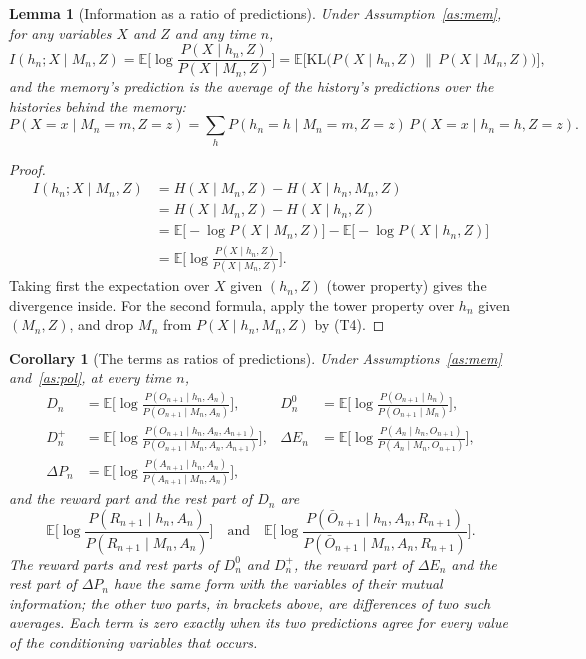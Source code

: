 \documentclass{article}
\newtheorem{lemma}[proposition]{Lemma}
\newtheorem{corollary}[proposition]{Corollary}
\theoremstyle{definition}
\theoremstyle{remark}
\newcommand{\E}{\mathbb{E}}
\newcommand{\dE}{\Delta E}
\newcommand{\dP}{\Delta P}
\newcommand{\Ob}{\bar O}
\newcommand{\KL}{\mathrm{KL}}
\newcommand{\why}[1]{\tag*{\small(#1)}}
\begin{document}
\begin{lemma}[Information as a ratio of predictions]\label{lem:ratio}
Under Assumption~\ref{as:mem}, for any variables $X$ and $Z$ and any time $n$,
\[
I(h_n;X\mid M_n,Z)=\E\Big[\log\frac{P(X\mid h_n,Z)}{P(X\mid M_n,Z)}\Big]=\E\Big[\KL\big(P(X\mid h_n,Z)\,\big\|\,P(X\mid M_n,Z)\big)\Big],
\]
and the memory's prediction is the average of the history's predictions over the histories behind the memory:
\[
P(X=x\mid M_n=m,Z=z)=\sum_hP(h_n=h\mid M_n=m,Z=z)\,P(X=x\mid h_n=h,Z=z).
\]
\end{lemma}

\begin{proof}
\begin{align*}
I(h_n;X\mid M_n,Z)&=H(X\mid M_n,Z)-H(X\mid h_n,M_n,Z) \why{T1}\\
&=H(X\mid M_n,Z)-H(X\mid h_n,Z) \why{T4}\\
&=\E\big[-\log P(X\mid M_n,Z)\big]-\E\big[-\log P(X\mid h_n,Z)\big] \why{definition of $H$}\\
&=\E\Big[\log\frac{P(X\mid h_n,Z)}{P(X\mid M_n,Z)}\Big].
\end{align*}
Taking first the expectation over $X$ given $(h_n,Z)$ (tower property) gives the divergence inside. For the second formula, apply the tower property over $h_n$ given $(M_n,Z)$, and drop $M_n$ from $P(X\mid h_n,M_n,Z)$ by (T4).
\end{proof}

\begin{corollary}[The terms as ratios of predictions]\label{cor:ratio}
Under Assumptions~\ref{as:mem} and~\ref{as:pol}, at every time $n$,
\begin{align*}
D_n&=\E\Big[\log\frac{P(O_{n+1}\mid h_n,A_n)}{P(O_{n+1}\mid M_n,A_n)}\Big], &
D^0_n&=\E\Big[\log\frac{P(O_{n+1}\mid h_n)}{P(O_{n+1}\mid M_n)}\Big],\\
D^+_n&=\E\Big[\log\frac{P(O_{n+1}\mid h_n,A_n,A_{n+1})}{P(O_{n+1}\mid M_n,A_n,A_{n+1})}\Big], &
\dE_n&=\E\Big[\log\frac{P(A_n\mid h_n,O_{n+1})}{P(A_n\mid M_n,O_{n+1})}\Big],\\
\dP_n&=\E\Big[\log\frac{P(A_{n+1}\mid h_n,A_n)}{P(A_{n+1}\mid M_n,A_n)}\Big], &&
\end{align*}
and the reward part and the rest part of $D_n$ are
\[
\E\Big[\log\frac{P(R_{n+1}\mid h_n,A_n)}{P(R_{n+1}\mid M_n,A_n)}\Big]\quad\text{and}\quad\E\Big[\log\frac{P(\Ob_{n+1}\mid h_n,A_n,R_{n+1})}{P(\Ob_{n+1}\mid M_n,A_n,R_{n+1})}\Big].
\]
The reward parts and rest parts of $D^0_n$ and $D^+_n$, the reward part of $\dE_n$ and the rest part of $\dP_n$ have the same form with the variables of their mutual information; the other two parts, in brackets above, are differences of two such averages. Each term is zero exactly when its two predictions agree for every value of the conditioning variables that occurs.
\end{corollary}
\end{document}
